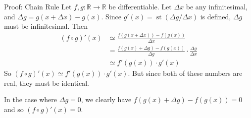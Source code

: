 \documentclass{beamer}
\theoremstyle{plain}
\theoremstyle{definition}
\newcommand{\reals}{\mathbb{R}}
\DeclareMathOperator{\st}{st}
\begin{document}
\begin{frame}{Proof: Chain Rule}
Let $f,g: \reals \to \reals$ be differentiable. Let $\Delta x$ be any infinitesimal, and $\Delta g = g(x + \Delta x) - g(x)$. Since $g'(x) = \st(\Delta g / \Delta x)$ is defined, $\Delta g$ must be infinitesimal. Then
\begin{align*}
(f \circ g)'(x) &\simeq \frac{f(g(x + \Delta x)) - f(g(x))}{\Delta x}  \\
	&= \frac{f(g(x) + \Delta g) - f(g(x))}{\Delta g} \cdot \frac{\Delta g}{\Delta x} \\ 
	&\simeq f'(g(x))\cdot g'(x)
\end{align*}
So $(f \circ g)'(x) \simeq f'(g(x)) \cdot g'(x)$. But since both of these numbers are real, they must be identical. \newline

In the case where $\Delta g = 0$, we clearly have $f(g(x) + \Delta g) - f(g(x)) = 0$ and so $(f \circ g)'(x) = 0$.
\end{frame}
\end{document}
